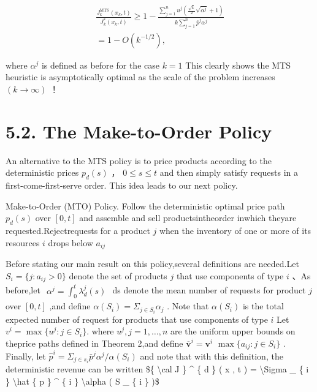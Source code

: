 \[
\begin{array} { l } { \displaystyle \frac { J _ { k } ^ { \mathrm { M T S } } ( x _ { k } , t ) } { J _ { k } ^ { * } ( x _ { k } , t ) } \geqslant 1 - \frac { \sum _ { j = 1 } ^ { n } u ^ { j } \left( \frac { \sqrt { k } } { 2 } \sqrt { \alpha ^ { j } } + 1 \right) } { k \sum _ { j = 1 } ^ { n } \bar { p } ^ { j } \alpha ^ { j } } } \\ { = 1 - O ( k ^ { - 1 / 2 } ) , } \end{array}
\]

where \(\alpha ^ { j }\) is defined as before for the case \(k = 1\)
This clearly shows the MTS heuristic is asymptotically optimal as the
scale of the problem increases \(( k \to \infty )\) ！

\section{5.2. The Make-to-Order Policy}\label{the-make-to-order-policy}

An alternative to the MTS policy is to price products according to the
deterministic prices \(p _ { d } ( s )\) ，
\(0 \leqslant s \leqslant t\) and then simply satisfy requests in a
first-come-first-serve order. This idea leads to our next policy.

Make-to-Order (MTO) Policy. Follow the deterministic optimal price path
\(p _ { d } ( s )\) over \([ 0 , t ]\) and assemble and sell
productsintheorder inwhich theyare requested.Rejectrequests for a
product \(j\) when the inventory of one or more of its resources \(i\)
drops below \(a _ { i j }\)

Before stating our main result on this policy,several definitions are
needed.Let \(S _ { i } = \{ j \colon a _ { i j } > 0 \}\) denote the set
of products \(j\) that use components of type \(i\) 、As before,let
\(\begin{array} { r } { \alpha ^ { j } = \int _ { 0 } ^ { t } \lambda _ { d } ^ { j } ( s ) } \end{array}\)
ds denote the mean number of requests for product \(j\) over
\([ 0 , t ]\) ,and define
\(\alpha ( S _ { i } ) = \Sigma _ { j \in S _ { i } } \alpha _ { j }\) .
Note that \(\alpha ( S _ { i } )\) is the total expected number of
request for products that use components of type \(i\) Let
\(v ^ { i } = \operatorname* { m a x } \{ u ^ { j } \colon j \in S _ { i } \} .\)
where \(u ^ { j } , j = 1 , \ldots , n\) are the uniform upper bounds on
theprice paths defined in Theorem 2,and define
\(\overline { { \boldsymbol { v } } } ^ { i } = \boldsymbol { v } ^ { i }\)
\(\operatorname* { m a x } \{ a _ { i j } \colon j \in S _ { i } \}\) .
Finally, let
\(\hat { p } ^ { i } = \Sigma _ { j \in { s _ { i } } } \bar { p } ^ { j } \alpha ^ { j } / \alpha ( S _ { i } )\)
and note that with this definition, the deterministic revenue can be
written {\$\{ \textbackslash cal J \} \^{} \{ d \} ( x , t ) =
\textbackslash Sigma \_ \{ i \} \textbackslash hat \{ p \} \^{} \{ i \}
\textbackslash alpha ( S \_ \{ i \} )\$}

